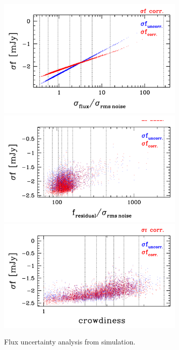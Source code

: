 \documentclass[11pt,a4paper]{article}
\begin{document}
\begin{figure}[H]
	\includegraphics[width=0.8\textwidth]{galsim_24_dfcorr_1}
	\includegraphics[width=0.8\textwidth]{galsim_24_dfcorr_2}
	\includegraphics[width=0.8\textwidth]{galsim_24_dfcorr_3}
	\caption{Flux uncertainty analysis from simulation.}
\end{figure}
\end{document}
